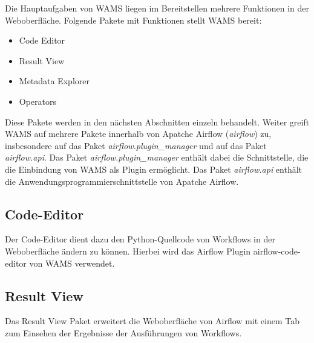 Die Hauptaufgaben von WAMS liegen im Bereitstellen mehrere Funktionen in der Weboberfläche.
Folgende Pakete mit Funktionen stellt WAMS bereit:
\begin{itemize}
    \item Code Editor
    \item Result View
    \item Metadata Explorer
    \item Operators
\end{itemize}
Diese Pakete werden in den nächsten Abschnitten einzeln behandelt.
Weiter greift WAMS auf mehrere Pakete innerhalb von Apatche Airflow (\textit{airflow}) zu, insbesondere auf das Paket \textit{airflow.plugin\_manager} und auf das Paket \textit{airflow.api}. Das Paket \textit{airflow.plugin\_manager} enthält dabei die Schnittstelle, die die Einbindung von WAMS als Plugin ermöglicht.
Das Paket \textit{airflow.api} enthält die Anwendungsprogrammierschnittstelle von Apatche Airflow.

\subsection{Code-Editor}
Der Code-Editor dient dazu den Python-Quellcode von Workflows in der Weboberfläche ändern zu können.
Hierbei wird das Airflow Plugin \gls{airflow-code-editor} von WAMS verwendet.

\subsection{Result View}
Das Result View Paket erweitert die Weboberfläche von Airflow mit einem Tab zum Einsehen der Ergebnisse der Ausführungen von Workflows.


